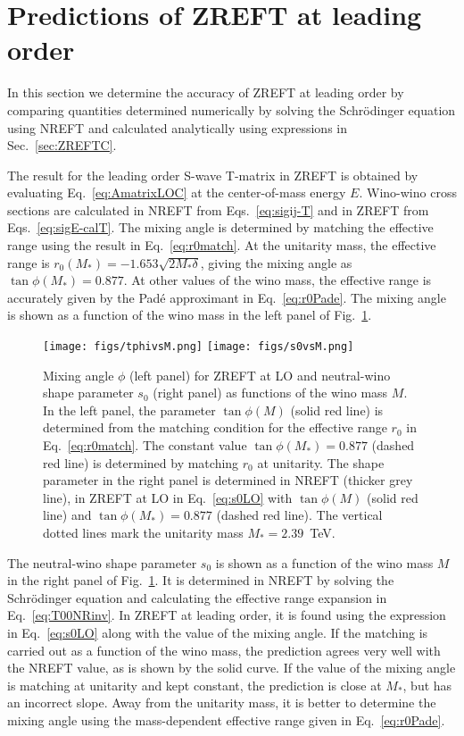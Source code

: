 \documentclass[%
 reprint,
 amsmath,amssymb,
 aps,
]{revtex4-1}
\begin{document}
\section{Predictions of ZREFT at leading order}
\label{sec:LOpredictions}

In this section we determine the accuracy of ZREFT at leading order by comparing quantities determined numerically by solving the Schr\"odinger equation using NREFT and calculated analytically using expressions in Sec.~\ref{sec:ZREFTC}.

The result for the leading order S-wave T-matrix in ZREFT is obtained by evaluating Eq.~\eqref{eq:AmatrixLOC} at the center-of-mass energy $E$.
Wino-wino cross sections are calculated in NREFT from Eqs.~\eqref{eq:sigij-T} and in ZREFT from Eqs.~\eqref{eq:sigE-calT}.
The mixing angle is determined by matching the effective range using the result in Eq.~\eqref{eq:r0match}.
At the unitarity mass, the effective range is $r_0(M_*) = -1.653 \sqrt{2M_*\delta}$, giving the mixing angle as $\tan\phi(M_*) = 0.877$.
At other values of the wino mass, the effective range is accurately given by the Pad\'e approximant in Eq.~\eqref{eq:r0Pade}.
The mixing angle is shown as a function of the wino mass in the left panel of Fig.~\ref{fig:tanphis0vsM}.
\begin{figure}[t]
\centering
\texttt{[image: figs/tphivsM.png]}
\texttt{[image: figs/s0vsM.png]}
\caption{Mixing angle $\phi$ (left panel) for ZREFT at LO and neutral-wino shape parameter $s_0$ (right panel) as functions of the wino mass $M$. In the left panel, the parameter $\tan\phi(M)$ (solid red line) is determined from the matching condition for the effective range $r_0$ in Eq.~\eqref{eq:r0match}. The constant value $\tan\phi(M_*)=0.877$ (dashed red line) is determined by matching $r_0$ at unitarity. The shape parameter in the right panel is determined in NREFT (thicker grey line), in ZREFT at LO in Eq.~\eqref{eq:s0LO} with $\tan\phi(M)$ (solid red line) and $\tan \phi(M_*) = 0.877$ (dashed red line). The vertical dotted lines mark the unitarity mass $M_* = 2.39$~TeV.}
\label{fig:tanphis0vsM}
\end{figure}

The neutral-wino shape parameter $s_0$ is shown as a function of the wino mass $M$ in the right panel of Fig.~\ref{fig:tanphis0vsM}.
It is determined in NREFT by solving the Schr\"odinger equation and calculating the effective range expansion in Eq.~\eqref{eq:T00NRinv}.
In ZREFT at leading order, it is found using the expression in Eq.~\eqref{eq:s0LO} along with the value of the mixing angle.
If the matching is carried out as a function of the wino mass, the prediction agrees very well with the NREFT value, as is shown by the solid curve.
If the value of the mixing angle is matching at unitarity and kept constant, the prediction is close at $M_*$, but has an incorrect slope.
Away from the unitarity mass, it is better to determine the mixing angle using the mass-dependent effective range given in Eq.~\eqref{eq:r0Pade}.
\end{document}

